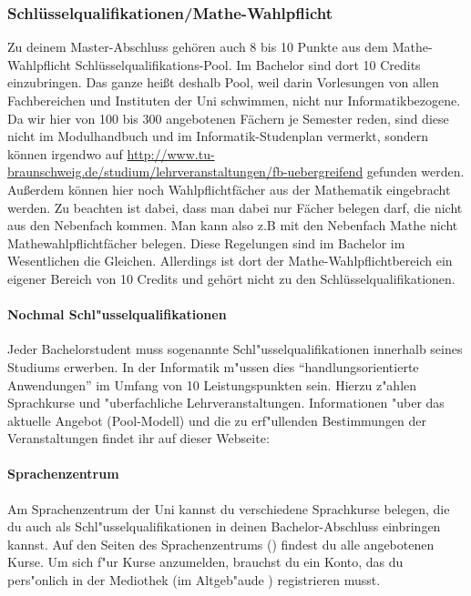 \begin{multicols}{2}
\subsubsection{Schlüsselqualifikationen/Mathe-Wahlpflicht}
Zu deinem Master-Abschluss gehören auch 8 bis 10 Punkte aus dem
Mathe-Wahlpflicht Schlüsselqualifikations-Pool. Im Bachelor sind dort
10 Credits einzubringen. Das ganze heißt deshalb Pool, weil darin
Vorlesungen von allen Fachbereichen und Instituten der Uni schwimmen,
nicht nur Informatikbezogene. Da wir hier von 100 bis 300 angebotenen
Fächern je Semester reden, sind diese nicht im Modulhandbuch und im
Informatik-Studenplan vermerkt, sondern können irgendwo auf
\url{http://www.tu-braunschweig.de/studium/lehrveranstaltungen/fb-uebergreifend}
gefunden werden. Außerdem können hier noch Wahlpflichtfächer aus der
Mathematik eingebracht werden.  Zu beachten ist dabei, dass man dabei
nur Fächer belegen darf, die nicht aus den Nebenfach kommen. Man kann
also z.B mit den Nebenfach Mathe nicht Mathewahlpflichtfächer
belegen. Diese Regelungen sind im Bachelor im Wesentlichen die
Gleichen. Allerdings ist dort der Mathe-Wahlpflichtbereich ein eigener
Bereich von 10 Credits und gehört nicht zu den Schlüsselqualifikationen.

\paragraph*{Nochmal Schl"usselqualifikationen}
Jeder Bachelorstudent muss sogenannte Schl"usselqualifikationen innerhalb seines Studiums erwerben.
In der Informatik m"ussen dies "`handlungsorientierte Anwendungen"' im Umfang von 10 Leistungspunkten sein.
Hierzu z"ahlen Sprachkurse und "uberfachliche Lehrveranstaltungen.
Informationen "uber das aktuelle Angebot (Pool-Modell) und die zu erf"ullenden Bestimmungen der Veranstaltungen findet ihr auf dieser Webseite: 

\paragraph*{Sprachenzentrum}
Am Sprachenzentrum der Uni kannst du verschiedene Sprachkurse belegen, die du auch als Schl"usselqualifikationen in deinen Bachelor-Abschluss einbringen kannst.
Auf den Seiten des Sprachenzentrums () findest du alle angebotenen Kurse.
Um sich f"ur Kurse anzumelden, brauchst du ein Konto, das du pers"onlich in der Mediothek (im Altgeb"aude ) registrieren musst.


\end{multicols}
